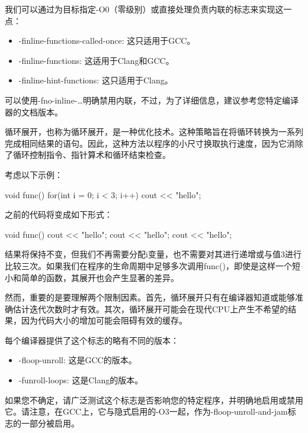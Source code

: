 我们可以通过为目标指定-O0（零级别）或直接处理负责内联的标志来实现这一点：

\begin{itemize}
\item
-finline-functions-called-once: 这只适用于GCC。

\item
-finline-functions: 这适用于Clang和GCC。

\item
-finline-hint-functions: 这只适用于Clang。
\end{itemize}

可以使用-fno-inline-…明确禁用内联，不过，为了详细信息，建议参考您特定编译器的文档版本。


循环展开，也称为循环展开，是一种优化技术。这种策略旨在将循环转换为一系列完成相同结果的语句。因此，这种方法以程序的小尺寸换取执行速度，因为它消除了循环控制指令、指针算术和循环结束检查。

考虑以下示例：

\begin{cpp}
void func() {
    for(int i = 0; i < 3; i++)
    cout << "hello\n";
}
\end{cpp}

之前的代码将变成如下形式：

\begin{cpp}
void func() {
    cout << "hello\n";
    cout << "hello\n";
    cout << "hello\n";
}
\end{cpp}

结果将保持不变，但我们不再需要分配i变量，也不需要对其进行递增或与值3进行比较三次。如果我们在程序的生命周期中足够多次调用func()，即使是这样一个短小和简单的函数，其展开也会产生显著的差异。

然而，重要的是要理解两个限制因素。首先，循环展开只有在编译器知道或能够准确估计迭代次数时才有效。其次，循环展开可能会在现代CPU上产生不希望的结果，因为代码大小的增加可能会阻碍有效的缓存。

每个编译器提供了这个标志的略有不同的版本：

\begin{itemize}
\item
-floop-unroll: 这是GCC的版本。

\item
-funroll-loops: 这是Clang的版本。
\end{itemize}

如果您不确定，请广泛测试这个标志是否影响您的特定程序，并明确地启用或禁用它。请注意，在GCC上，它与隐式启用的-O3一起，作为-floop-unroll-and-jam标志的一部分被启用。


